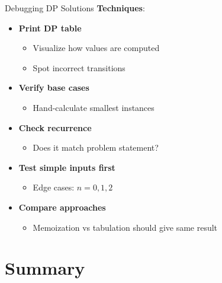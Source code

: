 \documentclass[aspectratio=169]{beamer}
\begin{document}
\begin{frame}{Debugging DP Solutions}
  \textbf{Techniques}:

  \vspace{0.3cm}

  \begin{itemize}
    \item \textbf{Print DP table}
    \begin{itemize}
      \item Visualize how values are computed
      \item Spot incorrect transitions
    \end{itemize}

    \vspace{0.2cm}

    \item \textbf{Verify base cases}
    \begin{itemize}
      \item Hand-calculate smallest instances
    \end{itemize}

    \vspace{0.2cm}

    \item \textbf{Check recurrence}
    \begin{itemize}
      \item Does it match problem statement?
    \end{itemize}

    \vspace{0.2cm}

    \item \textbf{Test simple inputs first}
    \begin{itemize}
      \item Edge cases: $n=0, 1, 2$
    \end{itemize}

    \vspace{0.2cm}

    \item \textbf{Compare approaches}
    \begin{itemize}
      \item Memoization vs tabulation should give same result
    \end{itemize}
  \end{itemize}
\end{frame}

\section{Summary}
\end{document}
